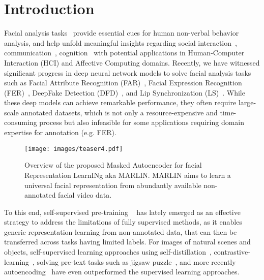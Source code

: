 \documentclass[10pt,twocolumn,letterpaper]{article}
\begin{document}
\section{Introduction}
\label{sec:intro}


Facial analysis tasks~\cite{guoMSCeleb1M2016,zhuCelebVHQ2022,tolosanaDeepfakes2020,kadamSurvey2021} provide essential cues for human non-verbal behavior analysis, and help unfold meaningful insights regarding social interaction~\cite{haughFace2009}, communication~\cite{jackHuman2015}, cognition~\cite{storrsUnsupervised2021} with potential applications in Human-Computer Interaction (HCI) and Affective Computing domains. Recently, we have witnessed significant progress in deep neural network models to solve facial analysis tasks such as Facial Attribute Recognition (FAR)~\cite{guoMSCeleb1M2016,zhuCelebVHQ2022}, Facial Expression Recognition (FER)~\cite{liDeep2022a}, DeepFake Detection (DFD)~\cite{tolosanaDeepfakes2020}, and Lip Synchronization (LS)~\cite{kadamSurvey2021}. While these deep models can achieve remarkable performance, they often require large-scale annotated datasets, which is not only a resource-expensive and time-consuming process but also infeasible for some applications requiring domain expertise for annotation (e.g. FER). 

\begin{figure}
    \centering
    \texttt{[image: images/teaser4.pdf]}
    \caption{Overview of the proposed Masked Autoencoder for facial Representation LearnINg aka MARLIN. MARLIN aims to learn a universal facial representation from abundantly available non-annotated facial video data.}
    \label{fig:teaser}
    \vspace{-1mm}
\end{figure}

To this end, self-supervised pre-training ~\cite{devlinBERT2019, heMasked2022, tongVideoMAE2022} has lately emerged as an effective strategy to address the limitations of fully supervised methods, as it enables generic representation learning from non-annotated data, that can then be transferred across tasks having limited labels. For images of natural scenes and objects, self-supervised learning approaches using self-distillation~\cite{caronEmerging2021}, contrastive-learning~\cite{chenBig2020,chenSimple2020}, solving pre-text tasks such as jigsaw puzzle~\cite{norooziUnsupervised2016}, and more recently autoencoding~\cite{heMasked2022,tongVideoMAE2022} have even outperformed the supervised learning approaches. 
\end{document}
